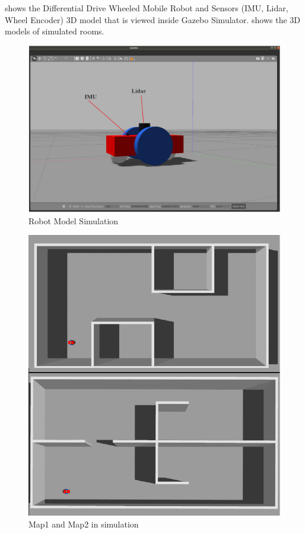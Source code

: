 \textbf{\figureautorefname{ \ref{fig:Robot Model Simulation}}} shows the Differential Drive Wheeled Mobile Robot and Sensors (IMU, Lidar, Wheel Encoder) 3D model that is viewed inside Gazebo Simulator. \textbf{\figureautorefname{ \ref{fig:Map1 and Map2 in simulation}}} shows the 3D models of simulated rooms.

\begin{figure}[ht]
	\centering
	\includegraphics[scale=1]{images/imagess/3method-gazebo.eps} 
	\caption{Robot Model Simulation}
	\label{fig:Robot Model Simulation}
\end{figure}

\begin{figure}[H]
	\centering
	\includegraphics[scale=1]{images/imagess/7reslt-map1and2.pdf} 
	\caption{Map1 and Map2 in simulation}
	\label{fig:Map1 and Map2 in simulation}
\end{figure}



